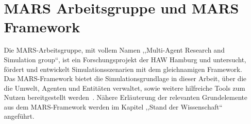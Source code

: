 %
%
\section{MARS Arbeitsgruppe und MARS Framework}\label{sec:mars-arbeitsgruppe-und-mars-framework}

Die MARS-Arbeitsgruppe, mit vollem Namen ,,Multi-Agent Research and Simulation group``, ist ein Forschungsprojekt der HAW Hamburg und untersucht, fördert und entwickelt Simulationsszenarien mit dem gleichnamigen Framework.
Das MARS-Framework bietet die Simulationsgrundlage in dieser Arbeit, über die die Umwelt, Agenten und Entitäten verwaltet, sowie weitere hilfreiche Tools zum Nutzen bereitgestellt werden~\cite{Mulack2020}.
Nähere Erläuterung der relevanten Grundelemente aus dem MARS-Framework werden im Kapitel ,,Stand der Wissenschaft`` angeführt.
